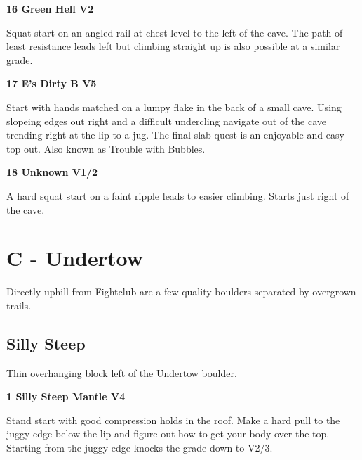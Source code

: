 \begin{multicols}{2}

					\label{rt:Green Hell}
\colorbox{green!20}{
\parbox{0.95\linewidth}{
\textbf{
16 Green Hell V2  
}
}
}

					\begin{adjustwidth}{0.5cm}{}				
					Squat start on an angled rail at chest level to the left of the cave. The path of least resistance leads left but climbing straight up is also possible at a similar grade.
					\end{adjustwidth}
					\label{rt:E's Dirty B}
\colorbox{RoyalBlue!20}{
\parbox{0.95\linewidth}{
\textbf{
17 E's Dirty B V5  
}
}
}

					\begin{adjustwidth}{0.5cm}{}				
					Start with hands matched on a lumpy flake in the back of a small cave. Using slopeing edges out right and a difficult undercling navigate out of the cave trending right at the lip to a jug. The final slab quest is an enjoyable and easy top out. Also known as Trouble with Bubbles.
					\end{adjustwidth}
					\label{rt:Unknown}
\colorbox{green!20}{
\parbox{0.95\linewidth}{
\textbf{
18 Unknown V1/2  
}
}
}

					\begin{adjustwidth}{0.5cm}{}				
					A hard squat start on a faint ripple leads to easier climbing. Starts just right of the cave.
					\end{adjustwidth}
\newpage

		\section{C - Undertow}\label{sa:Undertow}
	Directly uphill from Fightclub are a few quality boulders separated by overgrown trails.\\

	
			\subsection*{Silly Steep}\label{bf:Silly Steep}
			Thin overhanging block left of the Undertow boulder.\\
			
					\label{rt:Silly Steep Mantle}
\colorbox{RoyalBlue!20}{
\parbox{0.95\linewidth}{
\textbf{
1 Silly Steep Mantle V4  
}
}
}

					\begin{adjustwidth}{0.5cm}{}				
					Stand start with good compression holds in the roof. Make a hard pull to the juggy edge below the lip and figure out how to get your body over the top. Starting from the juggy edge knocks the grade down to V2/3.
					\end{adjustwidth}


\end{multicols}
